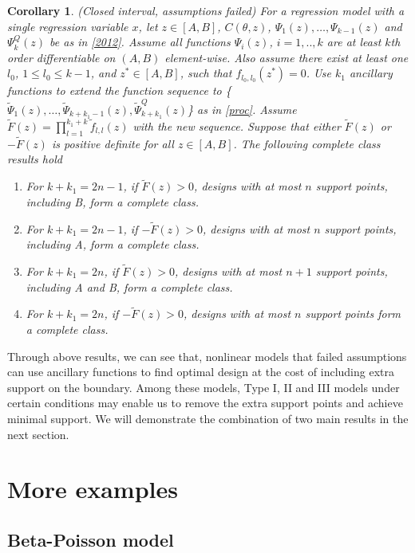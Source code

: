\documentclass[11pt]{amsart}
\newtheorem{corollary}{Corollary}[theorem]
\theoremstyle{definition}
\theoremstyle{remark}
\begin{document}
\begin{corollary}(Closed interval, assumptions failed)
For a regression model with a single regression variable $x$, let  $z\in[A,B]$, $C(\theta,z)$, $\Psi_1(z), \ldots,\Psi_{k-1}(z)$ and $\Psi_k^Q(z)$ be as in \ref{2012}. Assume all functions $\Psi_i(z)$, $i=1,..,k$ are at least $k$th order differentiable on $(A,B)$ element-wise. Also assume there exist at least one $l_0$, $1\le l_0\le k-1$, and $z^*\in [A,B]$, such that $f_{l_0,l_0}(z^*) = 0 $. Use $k_1$ ancillary functions to extend the function sequence to \{$\tilde{\Psi}_1(z), \ldots,\tilde{\Psi}_{k+k_1-1}(z), \tilde{\Psi}_{k+k_1}^Q(z)$\} as in \ref{proc}. Assume $\tilde{F}(z) = \prod_{l=1}^{k_1+k}\tilde{f}_{l,l}(z)$ with the new sequence. Suppose that either $\tilde{F}(z)$ or $-\tilde{F}(z)$ is positive definite for all $z\in [A,B]$. The following complete class results hold \begin{enumerate}
\item[(a)] For $k+k_1= 2n-1$, if $\tilde{F}(z)>0$,  designs with at most $n$ support points, including B, form a complete class. 
\item[(b)] For $k+k_1= 2n-1$, if $-\tilde{F}(z)>0$,  designs with at most $n$ support points, including A, form a complete class.
\item[(c)] For $k+k_1 = 2n$, if $\tilde{F}(z)>0$,  designs with at most $n+1$ support points, including A and B, form a complete class.
\item[(d)] For $k+k_1 = 2n$, if $-\tilde{F}(z)>0$,  designs with at most $n$ support points form a complete class.

\end{enumerate} 

\end{corollary}


Through above results, we can see that, nonlinear models that failed assumptions can use ancillary functions to find optimal design at the cost of including extra support on the boundary. Among these models, Type I, II and III models under certain conditions may enable us to remove the extra support points and achieve minimal support. We will demonstrate the combination of two main results in the next section.




\section{More examples}
 \subsection{Beta-Poisson model}
\end{document}
